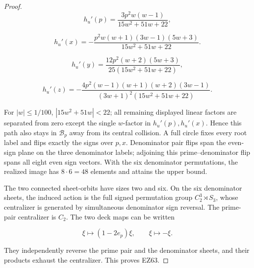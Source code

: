 \begin{proof}
\[
 h_u'(p)=\frac{3p^2w(w-1)}{15w^2+51w+22},
\]

\[
 h_u'(x)=
 -\frac{p^2w(w+1)(3w-1)(5w+3)}{15w^2+51w+22}.
\]

\[
 h_u'(y)=
 \frac{12p^2(w+2)(5w+3)}{25(15w^2+51w+22)},
\]

\[
 h_u'(z)=
 -\frac{4p^2(w-1)(w+1)(w+2)(3w-1)}
 {(3w+1)^2(15w^2+51w+22)}.
\]

For \(|w|\le1/100\),
\(|15w^2+51w|<22\); all remaining displayed linear factors are separated
from zero except the single \(w\)-factor in \(h_u'(p),h_u'(x)\).  Hence this
path also stays in \(\mathcal B_p\) away from its central collision.  A full circle fixes every root
label and flips exactly the signs over \(p,x\).  Denominator pair flips span
the even-sign plane on the three denominator labels; adjoining this
prime--denominator flip spans all eight even sign vectors.  With the six
denominator permutations, the realized image has \(8\cdot6=48\) elements and
attains the upper bound.

The two connected sheet-orbits have sizes two and six.  On the six
denominator sheets, the induced action is the full signed permutation group
\(C_2^3\rtimes S_3\), whose centralizer is generated by simultaneous
denominator sign reversal.  The prime-pair centralizer is \(C_2\).  The two
deck maps can be written

\[
 \xi\longmapsto(1-2e_p)\xi,\qquad \xi\longmapsto-\xi.
\]

They independently reverse the prime pair and the denominator sheets, and
their products exhaust the centralizer.  This proves EZ63.
\end{proof}

